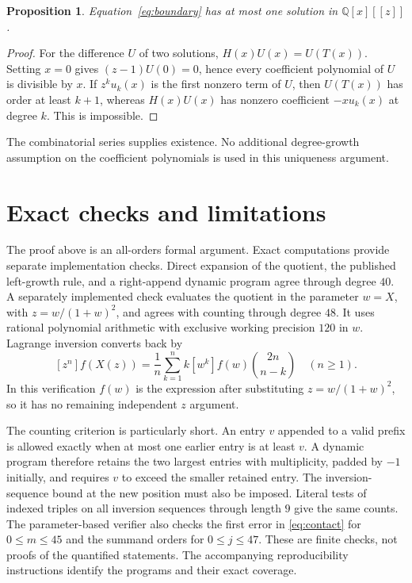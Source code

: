 \documentclass[11pt]{article}
\newtheorem{proposition}[theorem]{Proposition}
\newcommand{\Q}{\mathbb Q}
\begin{document}
\begin{proposition}\label{prop:unique}
Equation~\eqref{eq:boundary} has at most one solution in $\Q[x][[z]]$.
\end{proposition}
\begin{proof}
For the difference $U$ of two solutions, $H(x)U(x)=U(T(x))$.
Setting $x=0$ gives $(z-1)U(0)=0$, hence every coefficient polynomial
of $U$ is divisible by $x$. If $z^ku_k(x)$ is the first nonzero term
of $U$, then $U(T(x))$ has order at least $k+1$, whereas $H(x)U(x)$
has nonzero coefficient $-xu_k(x)$ at degree $k$. This is impossible.
\end{proof}
The combinatorial series supplies existence. No additional degree-growth
assumption on the coefficient polynomials is used in this uniqueness
argument.

\section{Exact checks and limitations}

The proof above is an all-orders formal argument. Exact computations
provide separate implementation checks. Direct expansion of the quotient,
the published left-growth rule, and a right-append dynamic program agree
through degree $40$. A separately implemented check evaluates the quotient
in the parameter $w=X$, with $z=w/(1+w)^2$, and agrees with counting
through degree $48$. It uses rational polynomial arithmetic with exclusive
working precision $120$ in $w$. Lagrange inversion
\cite[Theorem~2.1.1]{Gessel} converts back by
\begin{equation}\label{eq:lagrange}
 [z^n]f(X(z))=\frac1n\sum_{k=1}^n
 k[w^k]f(w)\binom{2n}{n-k}\quad(n\ge1).
\end{equation}
In this verification $f(w)$ is the expression after substituting
$z=w/(1+w)^2$, so it has no remaining independent $z$ argument.

The counting criterion is particularly short. An entry $v$ appended to
a valid prefix is allowed exactly when at most one earlier entry is
at least $v$. A dynamic program therefore retains the two largest entries
with multiplicity, padded by $-1$ initially, and requires $v$ to exceed
the smaller retained entry. The inversion-sequence bound at the new
position must also be imposed. Literal tests of indexed triples on all
inversion sequences through length $9$ give the same counts.
The parameter-based verifier also checks the first error in
\eqref{eq:contact} for $0\le m\le45$ and the summand orders for
$0\le j\le47$. These are finite checks, not proofs of the quantified
statements. The accompanying reproducibility instructions identify the
programs and their exact coverage.
\end{document}
